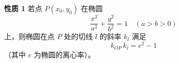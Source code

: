 \documentclass[UTF8]{ctexart}
\begin{document}
\noindent\textbf{性质 1}\quad
若点 $P(x_0,y_0)$ 在椭圆
\[
\frac{x^2}{a^2}+\frac{y^2}{b^2}=1 \quad (a>b>0)
\]
上，则椭圆在点 $P$ 处的切线 $l$ 的斜率 $k_l$ 满足
\[
k_{OP}\,k_l=e^2-1
\]
（其中 $e$ 为椭圆的离心率）。
\end{document}
